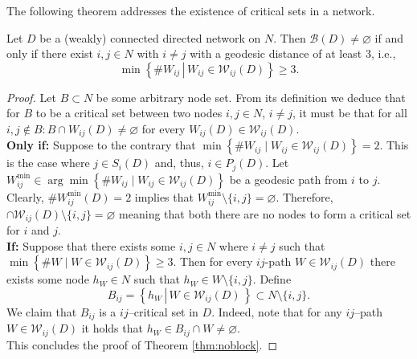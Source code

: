 The following theorem addresses the existence of critical sets in a network.
\begin{theorem} \label{thm:noblock}
Let $D$ be a (weakly) connected directed network on $N$. Then $\mathcal{B} (D) \neq \varnothing $ if and only if there exist $i,j \in N$ with $i \neq j$ with a geodesic distance of at least 3, i.e.,
\begin{equation}
\min \left\{ \left. \# W_{ij} \, \right| \, W_{ij} \in \mathcal{W}_{ij} (D) \right\} \geqslant 3 .
\end{equation}
\end{theorem}
\begin{proof}
Let $B \subset N$ be some arbitrary node set. From its definition we deduce that for $B$ to be a critical set between two nodes $i,j \in N$, $i \neq j$, it must be that for all $i,j \notin B \colon B \cap W_{ij}(D) \neq \varnothing$ for every $W_{ij}(D) \in \mathcal{W}_{ij}(D)$. 
\\[1ex]
\textbf{Only if:} Suppose to the contrary that $\min \left\{ \# W_{ij} \mid W_{ij} \in \mathcal{W}_{ij}(D) \right\} = 2$. This is the case where $j \in S_{i}(D)$ and, thus, $i \in P_{j}(D)$. Let $W^{\min}_{ij} \in \arg\min \left\{ \# W_{ij} \mid W_{ij} \in \mathcal{W}_{ij}(D) \right\}$ be a geodesic path from $i$ to $j$. Clearly, $\# W^{\min}_{ij}(D) = 2$ implies that $W_{ij}^{\min} \setminus \{i,j\} = \varnothing$. Therefore, $\cap \mathcal{W}_{ij} (D) \setminus \{ i,j \} = \varnothing$ meaning that both there are no nodes to form a critical set for $i$ and $j$.
\\[1ex]
\textbf{If:} Suppose that there exists some $i,j \in N$ where $i \neq j$ such that $\min \left\{ \#W \mid W \in \mathcal{W}_{ij}(D) \right\} \geqslant 3$. Then for every $ij$-path $W \in \mathcal{W}_{ij} (D)$ there exists some node $h_W \in N$ such that $h_W \in W \setminus \{i,j\}$. Define
\begin{equation}
B_{ij} = \left\{ h_W \, \left| \, W \in \mathcal{W}_{ij} (D) \, \right. \right\} \subset N \setminus \{ i,j \} .
\end{equation}
We claim that $B_{ij}$ is a $ij$--critical set in $D$. Indeed, note that for any $ij$--path $W \in \mathcal{W}_{ij} (D)$ it holds that $h_W \in B_{ij} \cap W \neq \varnothing$.
\\[1ex]
This concludes the proof of Theorem \ref{thm:noblock}.
\end{proof}

